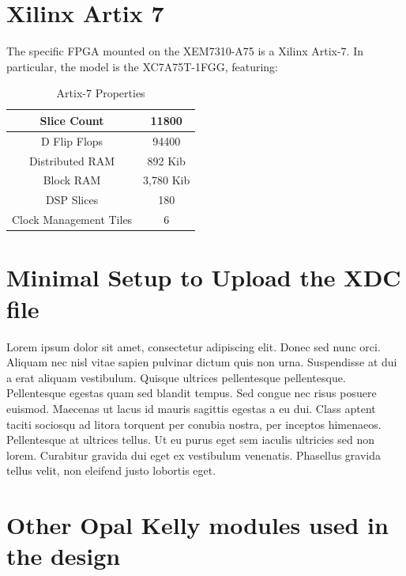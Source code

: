 \section{Xilinx Artix 7}
\label{sec:fpga-artix}
The specific FPGA mounted on the XEM7310-A75 is a Xilinx Artix-7. In particular, the model is the XC7A75T-1FGG, featuring:

\begin{table}[h!]
    \centering
    \begin{tabular}{|c|c|}
        \hline
        Slice Count & 11800 \\
        \hline
        D Flip Flops & 94400 \\
        \hline
        Distributed RAM & 892 Kib \\
        \hline
        Block RAM & 3,780 Kib \\
        \hline
        DSP Slices & 180\\
        \hline
        Clock Management Tiles & 6 \\
        \hline
    \end{tabular}
    \caption{Artix-7 Properties}
    \label{tab:artix-7-properties}
\end{table}

\section{Minimal Setup to Upload the XDC file}
\label{sec:123}
Lorem ipsum dolor sit amet, consectetur adipiscing elit. Donec sed nunc orci. Aliquam nec nisl vitae sapien pulvinar dictum quis non urna. Suspendisse at dui a erat aliquam vestibulum. Quisque ultrices pellentesque pellentesque. Pellentesque egestas quam sed blandit tempus. Sed congue nec risus posuere euismod. Maecenas ut lacus id mauris sagittis egestas a eu dui. Class aptent taciti sociosqu ad litora torquent per conubia nostra, per inceptos himenaeos. Pellentesque at ultrices tellus. Ut eu purus eget sem iaculis ultricies sed non lorem. Curabitur gravida dui eget ex vestibulum venenatis. Phasellus gravida tellus velit, non eleifend justo lobortis eget.

\section{Other Opal Kelly modules used in the design}


